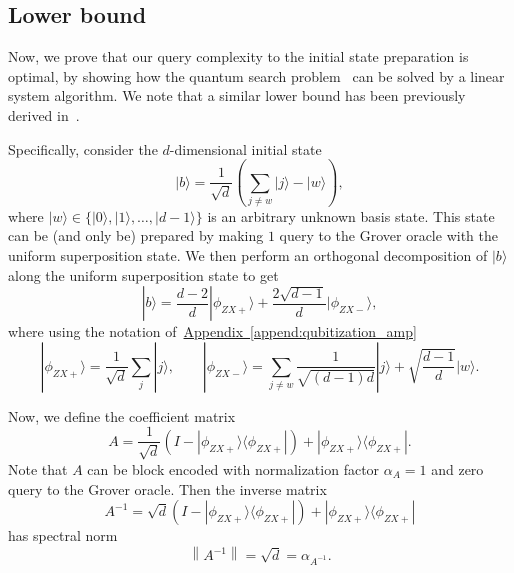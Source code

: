 \documentclass[letterpaper,onecolumn,11pt,accepted=2026-02-14]{quantumarticle}
\newcommand{\norm}[1]{\left\lVert#1\right\rVert}
\theoremstyle{remark}
\theoremstyle{plain}
\newcommand{\append}[1]{\hyperref[append:#1]{Appendix~\ref*{append:#1}}}
\newcommand{\ket}[1]{|#1\rangle}
\newcommand{\bra}[1]{\langle#1|}
\newcommand{\ketbra}[2]{\ket{#1}\!\bra{#2}}
\begin{document}
\subsection{Lower bound}
\label{sec:lin_lower}
Now, we prove that our query complexity to the initial state preparation is optimal, by showing how the quantum search problem~\cite{Grover} can be solved by a linear system algorithm. We note that a similar lower bound has been previously derived in~\cite{PRXQuantum.2.010315}.

Specifically, consider the $d$-dimensional initial state
\begin{equation}
    \ket{b}=\frac{1}{\sqrt{d}}\left(\sum_{j\neq w}\ket{j}-\ket{w}\right),
\end{equation}
where $\ket{w}\in\{\ket{0},\ket{1},\ldots,\ket{d-1}\}$ is an arbitrary unknown basis state. This state can be (and only be) prepared by making $1$ query to the Grover oracle with the uniform superposition state. We then perform an orthogonal decomposition of $\ket{b}$ along the uniform superposition state to get
\begin{equation}
    \ket{b}=\frac{d-2}{d}\ket{\phi_{ZX+}}+\frac{2\sqrt{d-1}}{d}\ket{\phi_{ZX-}},
\end{equation}
where using the notation of~\append{qubitization_amp}
\begin{equation}
    \ket{\phi_{ZX+}}=\frac{1}{\sqrt{d}}\sum_{j}\ket{j},\qquad
    \ket{\phi_{ZX-}}=\sum_{j\neq w}\frac{1}{\sqrt{(d-1)d}}\ket{j}+\sqrt{\frac{d-1}{d}}\ket{w}.
\end{equation}

Now, we define the coefficient matrix
\begin{equation}
    A=\frac{1}{\sqrt{d}}\left(I-\ketbra{\phi_{ZX+}}{\phi_{ZX+}}\right)+\ketbra{\phi_{ZX+}}{\phi_{ZX+}}.
\end{equation}
Note that $A$ can be block encoded with normalization factor $\alpha_A=1$ and zero query to the Grover oracle. Then the inverse matrix
\begin{equation}
    A^{-1}=\sqrt{d}\left(I-\ketbra{\phi_{ZX+}}{\phi_{ZX+}}\right)+\ketbra{\phi_{ZX+}}{\phi_{ZX+}}
\end{equation}
has spectral norm
\begin{equation}
    \norm{A^{-1}}=\sqrt{d}=\alpha_{A^{-1}}.
\end{equation}
\end{document}
